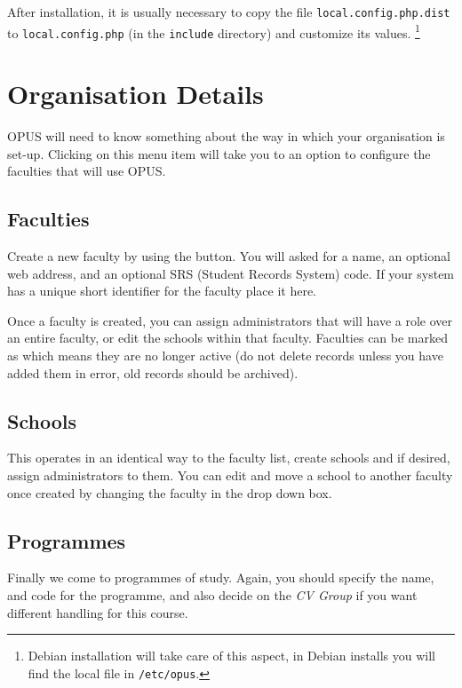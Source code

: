 \documentclass[12 pt]{book}
\begin{document}
After installation, it is usually necessary to copy the file
\lstinline!local.config.php.dist! to \lstinline!local.config.php! (in the 
\lstinline!include! directory) and customize its values.
\footnote{Debian installation will take care of this aspect, in Debian installs
you will find the local file in \lstinline!/etc/opus!.}

\section{Organisation Details}
\label{Organisation}

OPUS will need to know something about the way in which your organisation is
set-up. Clicking on this menu item will take you to an option to configure the
faculties that will use OPUS.

\subsection{Faculties}

Create a new faculty by using the 
button. You will asked for a name, an optional web address, and an optional SRS
(Student Records System) code. If your system has a unique short identifier for
the faculty place it here.

Once a faculty is created, you can assign administrators that will have a role
over an entire faculty, or edit the schools within that faculty. Faculties can
be marked as  which means they are no longer active (do not
delete records unless you have added them in error, old records should be
archived).

\subsection{Schools}

This operates in an identical way to the faculty list, create schools and if
desired, assign administrators to them. You can edit and move a school to
another faculty once created by changing the faculty in the drop down box.

\subsection{Programmes}

Finally we come to programmes of study. Again, you should specify the name, and
code for the programme, and also decide on the \emph{CV Group} if you want
different handling for this course.
\end{document}
